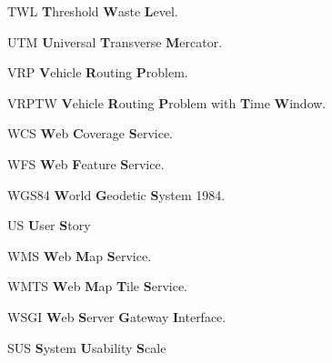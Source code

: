\begin{abbreviations}
    \item[TWL] \textbf{T}hreshold \textbf{W}aste \textbf{L}evel.
    \item[UTM] \textbf{U}niversal \textbf{T}ransverse \textbf{M}ercator.
    \item[VRP] \textbf{V}ehicle \textbf{R}outing \textbf{P}roblem.
    \item[VRPTW] \textbf{V}ehicle \textbf{R}outing \textbf{P}roblem with \textbf{T}ime \textbf{W}indow.
    \item[WCS] \textbf{W}eb \textbf{C}overage \textbf{S}ervice.
    \item[WFS] \textbf{W}eb \textbf{F}eature \textbf{S}ervice.
    \item[WGS84] \textbf{W}orld \textbf{G}eodetic \textbf{S}ystem 1984.
    \item[US] \textbf{U}ser \textbf{S}tory
    \item[WMS] \textbf{W}eb \textbf{M}ap \textbf{S}ervice.
    \item[WMTS] \textbf{W}eb \textbf{M}ap \textbf{T}ile \textbf{S}ervice.
    \item[WSGI] \textbf{W}eb \textbf{S}erver \textbf{G}ateway \textbf{I}nterface.
    \item[SUS] \textbf{S}ystem \textbf{U}sability \textbf{S}cale
\end{abbreviations}